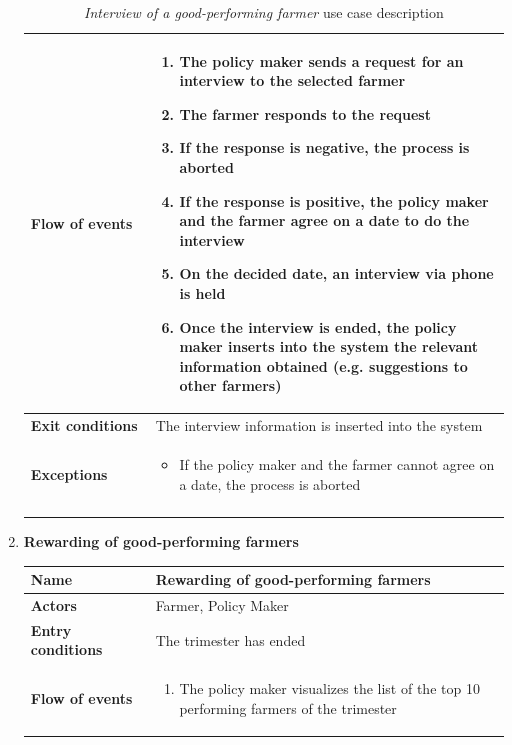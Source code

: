 \documentclass[10pt]{article}
\begin{document}
\begin{enumerate}
\begin{longtable}{p{0.26\linewidth}p{0.75\linewidth}}
            \midrule
            \textbf{Flow of events} & 
            \begin{enumerate}
                \item The policy maker sends a request for an interview to the selected farmer
                \item The farmer responds to the request
                \item If the response is negative, the process is aborted
                \item If the response is positive, the policy maker and the farmer agree on a date to do the interview
                \item On the decided date, an interview via phone is held
                \item Once the interview is ended, the policy maker inserts into the system the relevant information obtained (e.g. suggestions to other farmers)
            \end{enumerate} \\
            \midrule
            \textbf{Exit conditions} & The interview information is inserted into the system\\
            \midrule
            \textbf{Exceptions} & 
            \begin{itemize}
                \item If the policy maker and the farmer cannot agree on a date, the process is aborted
            \end{itemize} \\
            \bottomrule
            \caption{\emph{Interview of a good-performing farmer} use case description}
        \end{longtable}
    \newpage
    \item \textbf{Rewarding of good-performing farmers}
        \begin{longtable}{p{0.26\linewidth}p{0.75\linewidth}}
            \toprule
            \textbf{Name} & \textbf{Rewarding of good-performing farmers} \\
            \midrule
            \textbf{Actors} & Farmer, Policy Maker\\
            \midrule
            \textbf{Entry conditions} & The trimester has ended\\
            \midrule
            \textbf{Flow of events} & 
            \begin{enumerate}
                \item The policy maker visualizes the list of the top 10 performing farmers of the trimester

\end{enumerate}
\end{longtable}
\end{enumerate}
\end{document}

